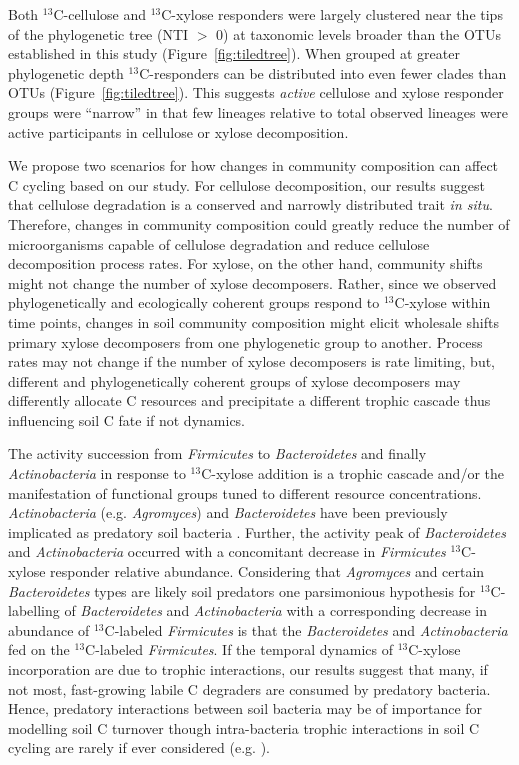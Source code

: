 Both $^{13}$C-cellulose and $^{13}$C-xylose responders were largely clustered
near the tips of the phylogenetic tree (NTI $>$ 0) at taxonomic levels broader
than the OTUs established in this study (Figure~\ref{fig:tiledtree}). When
grouped at greater phylogenetic depth $^{13}$C-responders can be distributed
into even fewer clades than OTUs (Figure~\ref{fig:tiledtree}). This suggests
\textit{active} cellulose and xylose responder groups were ``narrow'' in that
few lineages relative to total observed lineages were active participants in
cellulose or xylose decomposition. 

We propose two scenarios for how changes in community composition can affect
C cycling based on our study. For cellulose decomposition, our results suggest
that cellulose degradation is a conserved and narrowly distributed trait
\textit{in situ}. Therefore, changes in community composition could greatly
reduce the number of microorganisms capable of cellulose degradation and reduce
cellulose decomposition process rates. For xylose, on the other hand, community
shifts might not change the number of xylose decomposers. Rather, since we
observed phylogenetically and ecologically coherent groups respond to
$^{13}$C-xylose within time points, changes in soil community composition might
elicit wholesale shifts primary xylose decomposers from one phylogenetic group
to another. Process rates may not change if the number of xylose decomposers is
rate limiting, but, different and phylogenetically coherent groups of xylose
decomposers may differently allocate C resources and precipitate a different
trophic cascade thus influencing soil C fate if not dynamics. 

The activity succession from \textit{Firmicutes} to \textit{Bacteroidetes} and
finally \textit{Actinobacteria} in response to $^{13}$C-xylose addition is
a trophic cascade and/or the manifestation of functional groups tuned to
different resource concentrations. \textit{Actinobacteria} (e.g.
\textit{Agromyces}) and \textit{Bacteroidetes} have been previously implicated
as predatory soil bacteria \citep{Lueders2006,16346402}. Further, the activity
peak of \textit{Bacteroidetes} and \textit{Actinobacteria} occurred with
a concomitant decrease in \textit{Firmicutes} $^{13}$C-xylose responder
relative abundance. Considering that \textit{Agromyces} and certain
\textit{Bacteroidetes} types are likely soil predators  one parsimonious
hypothesis for $^{13}$C-labelling of \textit{Bacteroidetes} and
\textit{Actinobacteria} with a corresponding decrease in abundance of
$^{13}$C-labeled \textit{Firmicutes} is that the \textit{Bacteroidetes} and
\textit{Actinobacteria} fed on the $^{13}$C-labeled \textit{Firmicutes}. If the
temporal dynamics of $^{13}$C-xylose incorporation are due to trophic
interactions, our results suggest that many, if not most, fast-growing labile
C degraders are consumed by predatory bacteria. Hence, predatory interactions
between soil bacteria may be of importance for modelling soil C turnover though
intra-bacteria trophic interactions in soil C cycling are rarely if ever
considered (e.g. \citep{Moore1988}).

